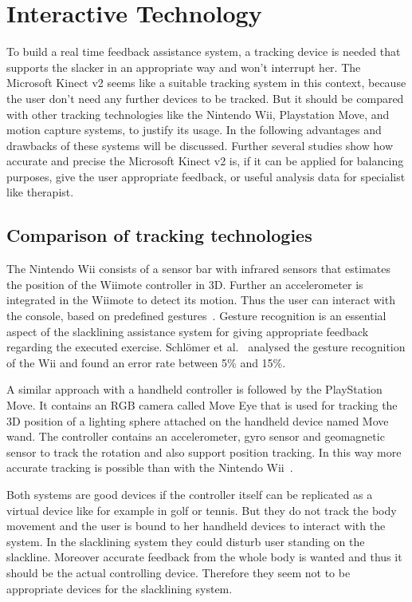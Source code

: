 \section{Interactive Technology}\label{2_3_interactiveTechnology}

To build a real time feedback assistance system, a tracking device is needed that supports the slacker in an appropriate way and won't interrupt her. The Microsoft Kinect v2 seems like a suitable tracking system in this context, because the user don't need any further devices to be tracked. But it should be compared with other tracking technologies like the Nintendo Wii, Playstation Move, and motion capture systems, to justify its usage. In the following advantages and drawbacks of these systems will be discussed. Further several studies show how accurate and precise the Microsoft Kinect v2 is, if it can be applied for balancing purposes, give the user appropriate feedback, or useful analysis data for specialist like therapist.

\subsection{Comparison of tracking technologies} \label{trackingTechnologie}

The Nintendo Wii consists of a sensor bar with infrared sensors that estimates the position of the Wiimote controller in 3D. Further an accelerometer is integrated in the Wiimote to detect its motion. Thus the user can interact with the console, based on predefined gestures~\cite{Bogdanovych2015-ci, Tanaka2012-ACO}. Gesture recognition is an essential aspect of the slacklining assistance system for giving appropriate feedback regarding the executed exercise. Schlömer et al.~\cite{Schlomer2008-uo} analysed the gesture recognition of the Wii and found an error rate between 5\% and 15\%.

A similar approach with a handheld controller is followed by the PlayStation Move. It contains an RGB camera called Move Eye that is used for tracking the 3D position of a lighting sphere attached on the handheld device named Move wand. The controller contains an accelerometer, gyro sensor and geomagnetic sensor to track the rotation and also support position tracking. In this way more accurate tracking is possible than with the Nintendo Wii~\cite{Bogdanovych2015-ci, Tanaka2012-ACO}.

Both systems are good devices if the controller itself can be replicated as a virtual device like for example in golf or tennis. But they do not track the body movement and the user is bound to her handheld devices to interact with the system. In the slacklining system they could disturb user standing on the slackline. Moreover accurate feedback from the whole body is wanted and thus it should be the actual controlling device. Therefore they seem not to be appropriate devices for the slacklining system.

